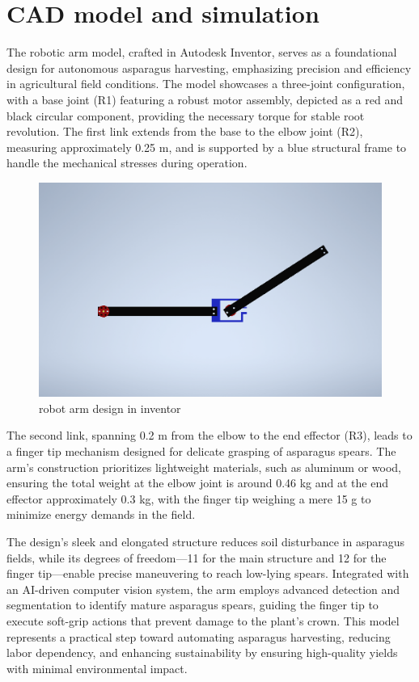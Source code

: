 \section{CAD model and simulation}


The robotic arm model, crafted in Autodesk Inventor, serves as a foundational 
design for autonomous asparagus harvesting, emphasizing precision and 
efficiency in agricultural field conditions. The model showcases a three-joint 
configuration, with a base joint (R1) featuring a robust motor assembly, 
depicted as a red and black circular component, providing the necessary torque 
for stable root revolution. The first link extends from the base to the elbow 
joint (R2), measuring approximately 0.25 m, and is supported by a blue 
structural frame to handle the mechanical stresses during operation. 

\begin{figure}
    \centering
    \includegraphics[width=0.75\linewidth]{inventor/inventor.png}
    \caption{robot arm design in inventor}
    \label{fig:enter-label}
\end{figure}




The second 
link, spanning 0.2 m from the elbow to the end effector (R3), leads to a finger 
tip mechanism designed for delicate grasping of asparagus spears. The arm’s 
construction prioritizes lightweight materials, such as aluminum or wood, 
ensuring the total weight at the elbow joint is around 0.46 kg and at the end 
effector approximately 0.3 kg, with the finger tip weighing a mere 15 g to 
minimize energy demands in the field. 






The design’s sleek and elongated structure reduces soil disturbance in 
asparagus fields, while its degrees of freedom---11 for the main structure and 
12 for the finger tip---enable precise maneuvering to reach low-lying spears. 
Integrated with an AI-driven computer vision system, the arm employs advanced 
detection and segmentation to identify mature asparagus spears, guiding the 
finger tip to execute soft-grip actions that prevent damage to the plant’s 
crown. This model represents a practical step toward automating asparagus 
harvesting, reducing labor dependency, and enhancing sustainability by ensuring 
high-quality yields with minimal environmental impact.


